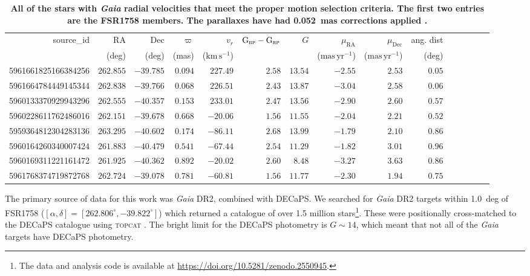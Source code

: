 \documentclass[fleqn,usenatbib]{mnras}
\newcommand{\kms}{\ensuremath{\textrm{km}\,\textrm{s}^{-1}}}
\newcommand{\masyr}{\ensuremath{\textrm{mas}\,\textrm{yr}^{-1}}}
\newcommand{\bprp}{\ensuremath{\textrm{G}_\textrm{\textsc{bp}}-\textrm{G}_\textrm{\textsc{rp}}}}
\begin{document}
\begin{table}
\centering
\caption{\textbf{All of the stars with \textit{Gaia} radial velocities that meet the proper motion selection criteria. The first two entries are the FSR1758 members. The parallaxes have had 0.052~mas corrections applied \citep{Zinn2018,Leung2019}.}}
\label{table:star_params}
\begin{tabular}{rrrrrrrrrrrrrrr}
\hline
source\_id & RA & Dec & $\varpi$ & $v_r$ & \bprp & $G$ & $\mu_\mathrm{RA}$ & $\mu_\mathrm{Dec}$ & ang. dist \\
 & (deg) & (deg) & (mas) & (\kms) &  &  & (\masyr) & (\masyr) & (deg) \\
\hline
5961661825166384256 & $262.855$ & $-39.785$ & $0.094$ & $227.49$ & $2.58$ & $13.54$ & $-2.55$ & $2.53$ & $0.05$ \\
5961664784449145344 & $262.838$ & $-39.766$ & $0.068$ & $226.51$ & $2.43$ & $13.87$ & $-3.04$ & $2.58$ & $0.06$ \\
5960133370929943296 & $262.555$ & $-40.357$ & $0.153$ & $233.01$ & $2.47$ & $13.56$ & $-2.90$ & $2.60$ & $0.57$ \\
5960228611762486016 & $262.151$ & $-39.678$ & $0.668$ & $-20.06$ & $1.56$ & $11.55$ & $-2.04$ & $2.21$ & $0.52$ \\
5959364812304283136 & $263.295$ & $-40.602$ & $0.174$ & $-86.11$ & $2.68$ & $13.99$ & $-1.79$ & $2.10$ & $0.86$ \\
5960164260340007424 & $261.883$ & $-40.479$ & $0.541$ & $-67.44$ & $2.54$ & $11.29$ & $-1.82$ & $3.01$ & $0.96$ \\
5960169311221161472 & $261.925$ & $-40.362$ & $0.892$ & $-20.02$ & $2.60$ & $8.48$ & $-3.27$ & $3.63$ & $0.86$ \\
5961768374719872768 & $262.724$ & $-39.078$ & $0.781$ & $-60.81$ & $1.56$ & $11.77$ & $-2.30$ & $1.94$ & $0.75$ \\
\hline
\end{tabular}
\end{table}

The primary source of data for this work was \textit{Gaia} DR2, combined with DECaPS. We searched for \textit{Gaia} DR2 targets within 1.0~deg of FSR1758 ($[\alpha,\delta]=[262.806^\circ,-39.822^\circ]$) which returned a catalogue of over 1.5 million stars\footnote{The data and analysis code is available at \url{https://doi.org/10.5281/zenodo.2550945}.}. These were positionally cross-matched to the DECaPS catalogue using \textsc{topcat} \citep{Taylor:2005wx,Taylor:2006wv}. The bright limit for the DECaPS photometry is $G\sim14$, which meant that not all of the \textit{Gaia} targets have DECaPS photometry.
\end{document}
